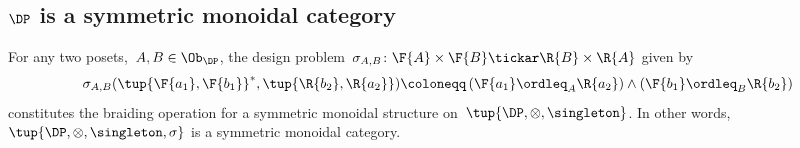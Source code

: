 \subsection{$\DP$ is a symmetric monoidal category}
\begin{lemma}
\label{lemma:symmetricmonoidaldp}
For any two posets,~$A,B \in\Ob_\DP$, the design problem~$\sigma_{A,B}\colon \F{A} \times \F{B} \tickar \R{B} \times \R{A}$ given by
\begin{equation}
        \sigma_{A,B}(\tup{\F{a_1},\F{b_1}}^*,\tup{\R{b_2},\R{a_2}})\coloneqq \left(\F{a_1}\ordleq_A \R{a_2}\right)\wedge \left(\F{b_1}\ordleq_B \R{b_2}\right)
\end{equation}
constitutes the braiding operation for a symmetric monoidal structure on~$\tup{\DP,\otimes,\singleton}$. In other words,~$\tup{\DP, \otimes, \singleton, \sigma}$ is a symmetric monoidal category.
\end{lemma}

